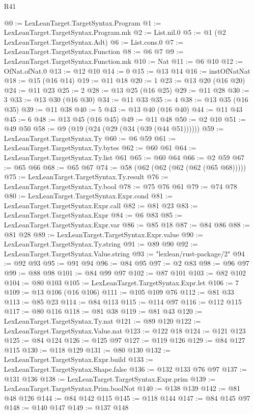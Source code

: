 \begin{lexlean}{R41}
\begin{coremodule}
@0 := LexLeanTarget.TargetSyntax.Program
@1 := LexLeanTarget.TargetSyntax.Program.mk
@2 := List.nil.{0}
@5 := @1 (@2 LexLeanTarget.TargetSyntax.Adt)
@6 := List.cons.{0}
@7 := LexLeanTarget.TargetSyntax.Function
@8 := @6 @7
@9 := LexLeanTarget.TargetSyntax.Function.mk
@10 := Nat
@11 := @6 @10
@12 := OfNat.ofNat.{0}
@13 := @12 @10
@14 := 0
@15 := @13 @14
@16 := instOfNatNat
@18 := @15 (@16 @14)
@19 := @11 @18
@20 := 1
@23 := @13 @20 (@16 @20)
@24 := @11 @23
@25 := 2
@28 := @13 @25 (@16 @25)
@29 := @11 @28
@30 := 3
@33 := @13 @30 (@16 @30)
@34 := @11 @33
@35 := 4
@38 := @13 @35 (@16 @35)
@39 := @11 @38
@40 := 5
@43 := @13 @40 (@16 @40)
@44 := @11 @43
@45 := 6
@48 := @13 @45 (@16 @45)
@49 := @11 @48
@50 := @2 @10
@51 := @49 @50
@58 := @9 (@19 (@24 (@29 (@34 (@39 (@44 @51))))))
@59 := LexLeanTarget.TargetSyntax.Ty
@60 := @6 @59
@61 := LexLeanTarget.TargetSyntax.Ty.bytes
@62 := @60 @61
@64 := LexLeanTarget.TargetSyntax.Ty.list @61
@65 := @60 @64
@66 := @2 @59
@67 := @65 @66
@68 := @65 @67
@74 := @58 (@62 (@62 (@62 (@62 (@65 @68)))))
@75 := LexLeanTarget.TargetSyntax.Ty.result
@76 := LexLeanTarget.TargetSyntax.Ty.bool
@78 := @75 @76 @61
@79 := @74 @78
@80 := LexLeanTarget.TargetSyntax.Expr.cond
@81 := LexLeanTarget.TargetSyntax.Expr.call
@82 := @81 @23
@83 := LexLeanTarget.TargetSyntax.Expr
@84 := @6 @83
@85 := LexLeanTarget.TargetSyntax.Expr.var
@86 := @85 @18
@87 := @84 @86
@88 := @81 @28
@89 := LexLeanTarget.TargetSyntax.Expr.value
@90 := LexLeanTarget.TargetSyntax.Ty.string
@91 := @89 @90
@92 := LexLeanTarget.TargetSyntax.Value.string
@93 := "lexlean/rust-package/2"
@94 := @92 @93
@95 := @91 @94
@96 := @84 @95
@97 := @2 @83
@98 := @96 @97
@99 := @88 @98
@101 := @84 @99 @97
@102 := @87 @101
@103 := @82 @102
@104 := @80 @103
@105 := LexLeanTarget.TargetSyntax.Expr.let
@106 := 7
@109 := @13 @106 (@16 @106)
@111 := @105 @109 @76
@112 := @81 @33
@113 := @85 @23
@114 := @84 @113
@115 := @114 @97
@116 := @112 @115
@117 := @80 @116
@118 := @81 @38
@119 := @81 @43
@120 := LexLeanTarget.TargetSyntax.Ty.nat
@121 := @89 @120
@122 := LexLeanTarget.TargetSyntax.Value.nat
@123 := @122 @18
@124 := @121 @123
@125 := @84 @124
@126 := @125 @97
@127 := @119 @126
@129 := @84 @127 @115
@130 := @118 @129
@131 := @80 @130
@132 := LexLeanTarget.TargetSyntax.Expr.build
@133 := LexLeanTarget.TargetSyntax.Shape.false
@136 := @132 @133 @76 @97
@137 := @131 @136
@138 := LexLeanTarget.TargetSyntax.Expr.prim
@139 := LexLeanTarget.TargetSyntax.Prim.boolNot
@140 := @138 @139
@142 := @81 @48 @126
@144 := @84 @142 @115
@145 := @118 @144
@147 := @84 @145 @97
@148 := @140 @147
@149 := @137 @148

\end{coremodule}
\end{lexlean}
